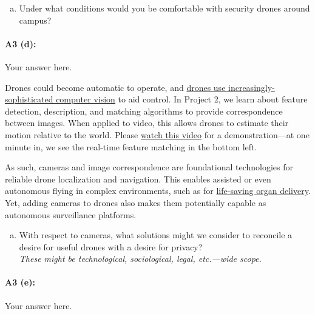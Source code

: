 \begin{enumerate}[(d)]
    \item Under what conditions would you be comfortable with security drones around campus?
\end{enumerate}

\paragraph{A3 (d):} Your answer here.




\newpage
Drones could become automatic to operate, and  \href{https://link.springer.com/article/10.1007/s10846-017-0483-z}{drones use increasingly-sophisticated computer vision} to aid control. In Project 2, we learn about feature detection, description, and matching algorithms to provide correspondence between images. When applied to video, this allows drones to estimate their motion relative to the world. Please \href{https://www.youtube.com/watch?v=jIvJuWdmemE}{watch this video} for a demonstration---at one minute in, we see the real-time feature matching in the bottom left.

As such, cameras and image correspondence are foundational technologies for reliable drone localization and navigation. This enables assisted or even autonomous flying in complex environments, such as for \href{https://www.cnn.com/2019/05/01/health/drone-organ-transplant-bn-trnd/index.html}{life-saving organ delivery}. Yet, adding cameras to drones also makes them potentially capable as autonomous surveillance platforms.

\begin{enumerate}[(e)]
    \item With respect to cameras, what solutions might we consider to reconcile a desire for useful drones with a desire for privacy? \\
    \emph{These might be technological, sociological, legal, etc.---wide scope.}
\end{enumerate}

\paragraph{A3 (e):} Your answer here.






\pagebreak
